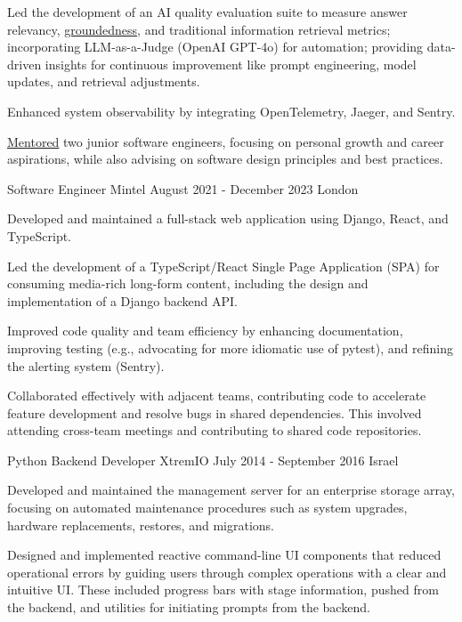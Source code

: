 \documentclass[11pt, a4paper]{awesome-cv}
\begin{document}
\begin{cventries}
{\begin{cvitems}
        \item {Led the development of an AI quality evaluation suite to measure answer relevancy, \href{https://leverstone.me/blog/automating-groundedness-evaluation-in-rag-applications}{groundedness}, and traditional information retrieval metrics; incorporating LLM-as-a-Judge (OpenAI GPT-4o) for automation; providing data-driven insights for continuous improvement like prompt engineering, model updates, and retrieval adjustments.}
        \item {Enhanced system observability by integrating OpenTelemetry, Jaeger, and Sentry.}
        \item {\href{https://leverstone.me/blog/mentoring-toolkit}{Mentored} two junior software engineers, focusing on personal growth and career aspirations, while also advising on software design principles and best practices.}
      \end{cvitems}
    }

  \cventry
    {Software Engineer}
    {Mintel}
    {August 2021 - December 2023}
    {London}
    {
      \begin{cvitems}
        \item {Developed and maintained a full-stack web application using Django, React, and TypeScript.}
        \item {Led the development of a TypeScript/React Single Page Application (SPA) for consuming media-rich long-form content, including the design and implementation of a Django backend API.}
        \item {Improved code quality and team efficiency by enhancing documentation, improving testing (e.g., advocating for more idiomatic use of pytest), and refining the alerting system (Sentry).}
        \item {Collaborated effectively with adjacent teams, contributing code to accelerate feature development and resolve bugs in shared dependencies. This involved attending cross-team meetings and contributing to shared code repositories.}
      \end{cvitems}
    }

  \cventry
    {Python Backend Developer}
    {XtremIO}
    {July 2014 - September 2016}
    {Israel}
    {
      \begin{cvitems}
        \item {Developed and maintained the management server for an enterprise storage array, focusing on automated maintenance procedures such as system upgrades, hardware replacements, restores, and migrations.}
        \item {Designed and implemented reactive command-line UI components that reduced operational errors by guiding users through complex operations with a clear and intuitive UI. These included progress bars with stage information, pushed from the backend, and utilities for initiating prompts from the backend.}
      \end{cvitems}
    }

\end{cventries}
\end{document}
